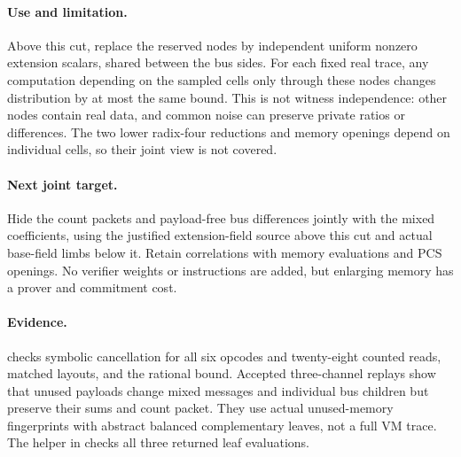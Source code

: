 \documentclass[11pt]{article}
\begin{document}
\paragraph{Use and limitation.} Above this cut, replace the reserved nodes by independent uniform nonzero extension scalars, shared between the bus sides. For each fixed real trace, any computation depending on the sampled cells only through these nodes changes distribution by at most the same bound. This is not witness independence: other nodes contain real data, and common noise can preserve private ratios or differences. The two lower radix-four reductions and memory openings depend on individual cells, so their joint view is not covered.

\paragraph{Next joint target.} Hide the count packets and payload-free bus differences jointly with the mixed coefficients, using the justified extension-field source above this cut and actual base-field limbs below it. Retain correlations with memory evaluations and PCS openings. No verifier weights or instructions are added, but enlarging memory has a prover and commitment cost.

\paragraph{Evidence.}  checks symbolic cancellation for all six opcodes and twenty-eight counted reads, matched layouts, and the rational bound. Accepted three-channel replays show that unused payloads change mixed messages and individual bus children but preserve their sums and count packet. They use actual unused-memory fingerprints with abstract balanced complementary leaves, not a full VM trace. The helper in  checks all three returned leaf evaluations.
\end{document}
